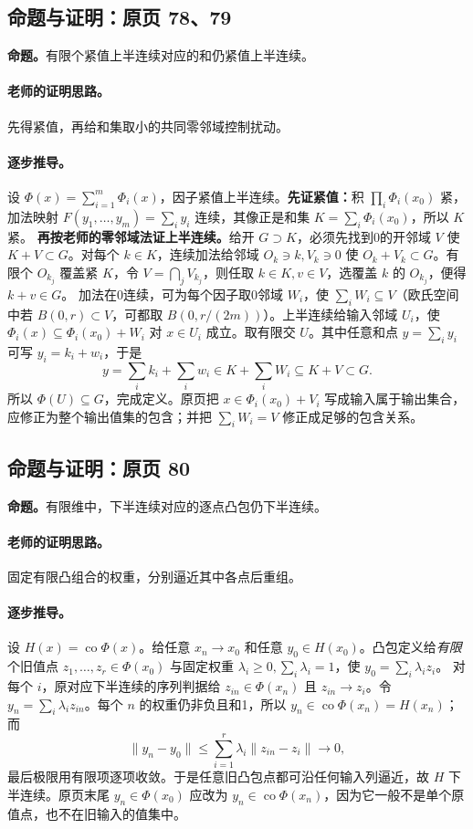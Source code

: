 \documentclass[11pt,a4paper]{article}
\theoremstyle{definition}\newtheorem{definition}{定义}\newtheorem{example}{例}
\begin{document}
\subsection{命题与证明：原页 78、79}

\textbf{命题。}有限个紧值上半连续对应的和仍紧值上半连续。

\paragraph{老师的证明思路。}先得紧值，再给和集取小的共同零邻域控制扰动。

\paragraph{逐步推导。}
设 $\Phi(x)=\sum_{i=1}^m\Phi_i(x)$，因子紧值上半连续。\textbf{先证紧值：}积 $\prod_i\Phi_i(x_0)$ 紧，加法映射 $F(y_1,\ldots,y_m)=\sum_iy_i$ 连续，其像正是和集 $K=\sum_i\Phi_i(x_0)$，所以 $K$ 紧。
\textbf{再按老师的零邻域法证上半连续。}给开 $G\supset K$，必须先找到0的开邻域 $V$ 使 $K+V\subset G$。对每个 $k\in K$，连续加法给邻域 $O_k\ni k,V_k\ni0$ 使 $O_k+V_k\subset G$。有限个 $O_{k_j}$ 覆盖紧 $K$，令 $V=\bigcap_jV_{k_j}$，则任取 $k\in K,v\in V$，选覆盖 $k$ 的 $O_{k_j}$，便得 $k+v\in G$。
加法在0连续，可为每个因子取0邻域 $W_i$，使 $\sum_iW_i\subseteq V$（欧氏空间中若 $B(0,r)\subset V$，可都取 $B(0,r/(2m))$）。上半连续给输入邻域 $U_i$，使 $\Phi_i(x)\subseteq\Phi_i(x_0)+W_i$ 对 $x\in U_i$ 成立。取有限交 $U$。其中任意和点 $y=\sum_iy_i$ 可写 $y_i=k_i+w_i$，于是
\[y=\sum_i k_i+\sum_iw_i\in K+\sum_iW_i\subseteq K+V\subset G.\]
所以 $\Phi(U)\subseteq G$，完成定义。原页把 $x\in\Phi_i(x_0)+V_i$ 写成输入属于输出集合，应修正为整个输出值集的包含；并把 $\sum_iW_i=V$ 修正成足够的包含关系。


\subsection{命题与证明：原页 80}

\textbf{命题。}有限维中，下半连续对应的逐点凸包仍下半连续。

\paragraph{老师的证明思路。}固定有限凸组合的权重，分别逼近其中各点后重组。

\paragraph{逐步推导。}
设 $H(x)=\operatorname{co}\Phi(x)$。给任意 $x_n\to x_0$ 和任意 $y_0\in H(x_0)$。凸包定义给\emph{有限}个旧值点 $z_1,\ldots,z_r\in\Phi(x_0)$ 与固定权重 $\lambda_i\ge0,\sum_i\lambda_i=1$，使 $y_0=\sum_i\lambda_i z_i$。
对每个 $i$，原对应下半连续的序列判据给 $z_{in}\in\Phi(x_n)$ 且 $z_{in}\to z_i$。令 $y_n=\sum_i\lambda_i z_{in}$。每个 $n$ 的权重仍非负且和1，所以 $y_n\in\operatorname{co}\Phi(x_n)=H(x_n)$；而
\[\|y_n-y_0\|\le\sum_{i=1}^r\lambda_i\|z_{in}-z_i\|\to0,\]
最后极限用有限项逐项收敛。于是任意旧凸包点都可沿任何输入列逼近，故 $H$ 下半连续。原页末尾 $y_n\in\Phi(x_0)$ 应改为 $y_n\in\operatorname{co}\Phi(x_n)$，因为它一般不是单个原值点，也不在旧输入的值集中。
\end{document}
